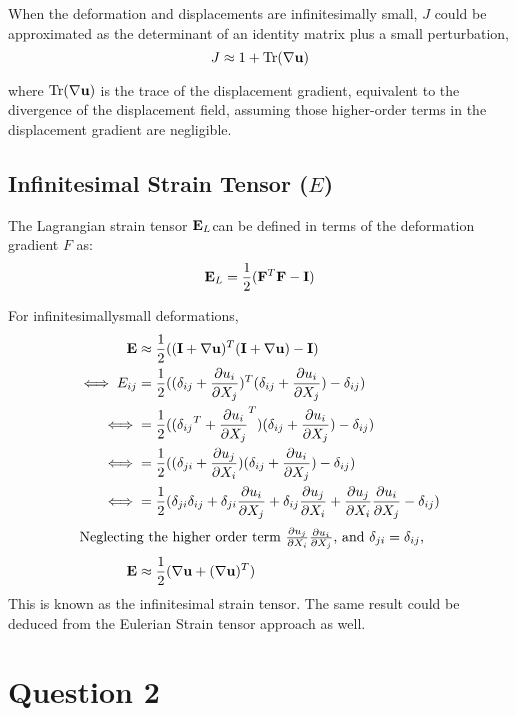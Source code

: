 \documentclass[a4paper,12pt]{article} %
\begin{document}
When the deformation and displacements are infinitesimally small, \(J\) could be approximated as the determinant of an identity matrix plus a small perturbation,
\[ J \approx 1 + \text{Tr}(\nabla \mathbf{u}) \]

where \(\text{Tr}(\nabla \mathbf{u})\) is the trace of the displacement gradient, equivalent to the divergence of the displacement field, assuming those higher-order terms in the displacement gradient are negligible.

\subsection{Infinitesimal Strain Tensor (\(E\))}

The Lagrangian strain tensor \({\mathbf{E}}_{L}\)can be defined in terms of the deformation gradient \(F\) as:
\[ {\mathbf{E}}_{L} = \frac{1}{2}({\mathbf{F}}^T \mathbf{F} - \mathbf{I}) \]

For infinitesimallysmall deformations, %
\begin{align*}
{\mathbf{E}} & \approx \frac{1}{2}((\mathbf{I} + \nabla \mathbf{u})^T(\mathbf{I} + \nabla \mathbf{u}) - \mathbf{I}) \\
\iff E_{ij} & = \frac{1}{2} ((\delta_{ij} + \frac{\partial u_i}{\partial X_j})^T(\delta_{ij} + \frac{\partial u_i}{\partial X_j}) - \delta_{ij}) \\
\iff & = \frac{1}{2} (({\delta_{ij}}^T + {\frac{\partial u_i}{\partial X_j}}^T)(\delta_{ij} + \frac{\partial u_i}{\partial X_j}) - \delta_{ij}) \\
\iff & = \frac{1}{2} (({\delta_{ji}} + {\frac{\partial u_j}{\partial X_i}})(\delta_{ij} + \frac{\partial u_i}{\partial X_j}) - \delta_{ij}) \\
\iff & = \frac{1}{2} ({\delta_{ji}} {\delta_{ij}} + {\delta_{ji}}{\frac{\partial u_i}{\partial X_j}} + \delta_{ij}\frac{\partial u_j}{\partial X_i} +\frac{\partial u_j}{\partial X_i}\frac{\partial u_i}{\partial X_j} - \delta_{ij}) \\
\intertext{Neglecting the higher order term $\frac{\partial u_j}{\partial X_i}\frac{\partial u_i}{\partial X_j}$, and $\delta_{ji}=\delta_{ij}$,}
{\mathbf{E}} & \approx \frac{1}{2}(\nabla \mathbf{u} + (\nabla \mathbf{u})^T)
\end{align*}
This is known as the infinitesimal strain tensor. The same result could be deduced from the Eulerian Strain tensor approach as well.

\newpage

\section{\textbf{Question 2}}
\end{document}
